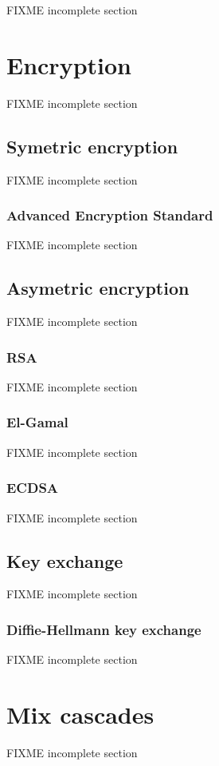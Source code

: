 FIXME incomplete section

\section{Encryption}
FIXME incomplete section

\subsection{Symetric encryption}
FIXME incomplete section

\subsubsection{Advanced Encryption Standard}
FIXME incomplete section

\subsection{Asymetric encryption}
FIXME incomplete section

\subsubsection{RSA}
FIXME incomplete section

\subsubsection{El-Gamal}
FIXME incomplete section

\subsubsection{ECDSA}
FIXME incomplete section

\subsection{Key exchange}
FIXME incomplete section

\subsubsection{Diffie-Hellmann key exchange}
FIXME incomplete section

\section{Mix cascades}
FIXME incomplete section

